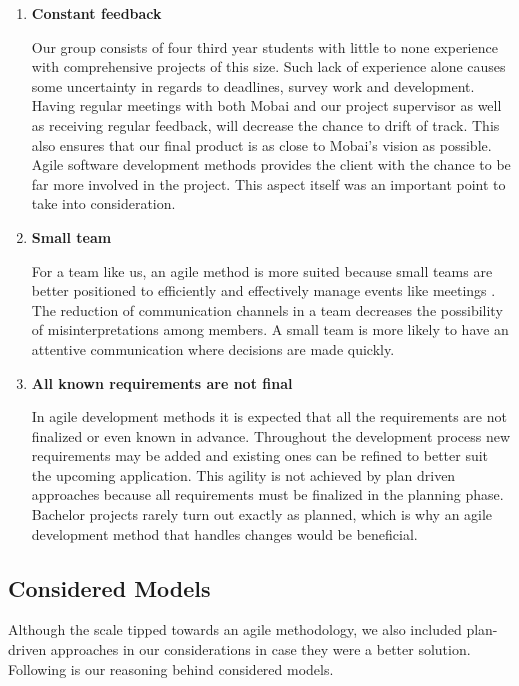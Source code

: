 \begin{enumerate}
    \item \textbf{Constant feedback} 
    
    \hspace{0,5cm}Our group consists of four third year students with little to none experience with comprehensive projects of this size. Such lack of experience alone causes some uncertainty in regards to deadlines, survey work and development. Having regular meetings with both Mobai and our project supervisor as well as receiving regular feedback, will decrease the chance to drift of track. This also ensures that our final product is as close to Mobai's vision as possible. Agile software development methods provides the client with the chance to be far more involved in the project. This aspect itself was an important point to take into consideration.
        
    \item \textbf{Small team}
    
    \hspace{0,5cm}For a team like us, an agile method is more suited because small teams are better positioned to efficiently and effectively manage events like meetings \cite{SmallTeams}. The reduction of communication channels in a team decreases the possibility of misinterpretations among members. A small team is more likely to have an attentive communication where decisions are made quickly.
    \newpage
    
    \item \textbf{All known requirements are not final}
    
    \hspace{0,5cm}In agile development methods it is expected that all the requirements are not finalized or even known in advance. Throughout the development process new requirements may be added and existing ones can be refined to better suit the upcoming application. This agility is not achieved by plan driven approaches because all requirements must be finalized in the planning phase. Bachelor projects rarely turn out exactly as planned, which is why an agile development method that handles changes would be beneficial. 
\end{enumerate}

\subsection{Considered Models}
Although the scale tipped towards an agile methodology, we also included plan-driven approaches in our considerations in case they were a better solution. Following is our reasoning behind considered models.  

